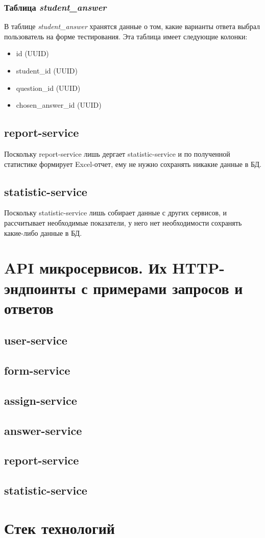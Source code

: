 \documentclass[4paper,12pt]{article}
\begin{document}
	\subsubsection{Таблица \textit{student\_answer}}
	В таблице \textit{student\_answer} хранятся данные о том, какие варианты ответа выбрал пользователь на форме тестирования. Эта таблица имеет следующие колонки:
	\begin{itemize}
		\item id (UUID)
		\item student\_id (UUID)
		\item question\_id (UUID)
		\item chosen\_answer\_id (UUID)
	\end{itemize}
	
	\subsection{report-service}
	Поскольку report-service лишь дергает statistic-service и по полученной статистике формирует Excel-отчет, ему не нужно сохранять никакие данные в БД.
	
	\subsection{statistic-service}
	Поскольку statistic-service лишь собирает данные с других сервисов, и рассчитывает необходимые показатели, у него нет необходимости сохранять какие-либо данные в БД.
		
	\section{API микросервисов. Их HTTP-эндпоинты с примерами запросов и ответов}
	\subsection{user-service}
	\subsection{form-service}
	\subsection{assign-service}
	\subsection{answer-service}
	\subsection{report-service}
	\subsection{statistic-service}
	
	\section{Стек технологий}
\end{document}
